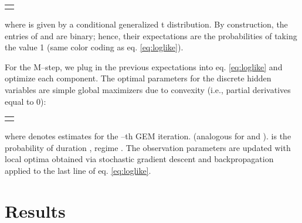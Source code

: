 \documentclass[runningheads]{llncs}
\begin{document}
\begin{table*}[h!]
	\centering
\begin{tabular}{|c |c|}
		\hline
		\parbox[][1.15cm][t]{6.5cm}{}&
		\parbox[][1.15cm][t]{5.5cm}{}\\
		\hline
		\\
		\hline
	\end{tabular}
\end{table*}
where  is given by a conditional generalized t distribution. By construction, the entries of  and  are binary; hence, their expectations  are the probabilities of taking the value 1 (same color coding as eq. \eqref{eq:loglike}). 


For the M--step, we plug in the previous expectations into eq. \eqref{eq:loglike} and optimize each \theta component. The optimal parameters for the discrete hidden variables are simple global maximizers due to convexity  (i.e., partial derivatives equal to 0):
\begin{table*}[!]
	\centering
\begin{tabular}{|c |c|}
		\hline
		\parbox{4cm}{}&
		\parbox[][1.05cm][t]{8cm}{}\\
		\hline
		\\
		\hline
	\end{tabular}
\end{table*}


where  denotes estimates for the --th GEM iteration.  (analogous for  and ). \boldmath\unboldmath is the probability of duration , regime . The observation parameters are updated with local optima obtained via stochastic gradient descent and backpropagation applied to the last line of eq. \eqref{eq:loglike}. 

\section{Results}
\label{sec:results}
\end{document}
